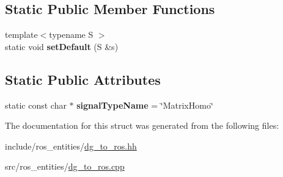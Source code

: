\subsection*{Static Public Member Functions}
\begin{DoxyCompactItemize}
\item 
{\footnotesize template$<$typename S $>$ }\\static void {\bfseries set\+Default} (S \&s)\hypertarget{structdynamic__graph_1_1DgToRos_3_01std_1_1pair_3_01MatrixHomogeneous_00_01Vector_01_4_01_4_ab5d21c1a813043c42b1444084d2001b5}{}\label{structdynamic__graph_1_1DgToRos_3_01std_1_1pair_3_01MatrixHomogeneous_00_01Vector_01_4_01_4_ab5d21c1a813043c42b1444084d2001b5}

\end{DoxyCompactItemize}
\subsection*{Static Public Attributes}
\begin{DoxyCompactItemize}
\item 
static const char $\ast$ {\bfseries signal\+Type\+Name} = \char`\"{}Matrix\+Homo\char`\"{}\hypertarget{structdynamic__graph_1_1DgToRos_3_01std_1_1pair_3_01MatrixHomogeneous_00_01Vector_01_4_01_4_a1d5bcd8801ebb4c87d4870ed195f01c2}{}\label{structdynamic__graph_1_1DgToRos_3_01std_1_1pair_3_01MatrixHomogeneous_00_01Vector_01_4_01_4_a1d5bcd8801ebb4c87d4870ed195f01c2}

\end{DoxyCompactItemize}


The documentation for this struct was generated from the following files\+:\begin{DoxyCompactItemize}
\item 
include/ros\+\_\+entities/\hyperlink{dg__to__ros_8hh}{dg\+\_\+to\+\_\+ros.\+hh}\item 
src/ros\+\_\+entities/\hyperlink{dg__to__ros_8cpp}{dg\+\_\+to\+\_\+ros.\+cpp}\end{DoxyCompactItemize}
